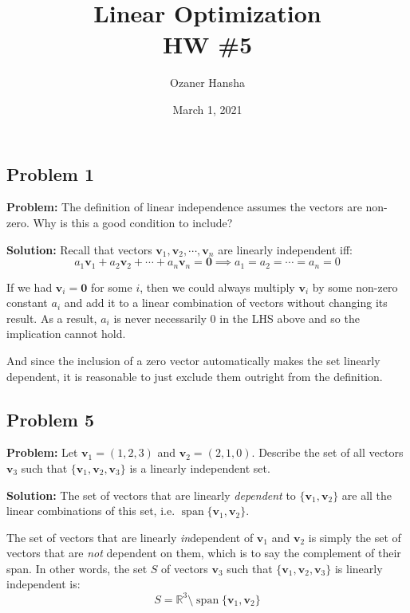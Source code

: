\documentclass{article}
\renewcommand\vec{\mathbf}
\newcommand{\R}{\mathbb R}
\begin{document}
\title{Linear Optimization\\HW \#5}
\author{Ozaner Hansha}
\date{March 1, 2021}
\maketitle

\subsection*{Problem 1}
\noindent\textbf{Problem:} The definition of linear independence assumes the vectors are non-zero. Why is this a good condition to include?
\bigskip

\noindent\textbf{Solution:} Recall that vectors $\vec v_1,\vec v_2,\cdots,\vec v_n$ are linearly independent iff:
\begin{equation*}
    a_1\vec v_1+a_2\vec v_2+\cdots+a_n\vec v_n=\vec 0\implies a_1=a_2=\cdots=a_n=0
\end{equation*}

If we had $\vec v_i=\vec 0$ for some $i$, then we could always multiply $\vec v_i$ by some non-zero constant $a_i$ and add it to a linear combination of vectors without changing its result. As a result, $a_i$ is never necessarily 0 in the LHS above and so the implication cannot hold.

And since the inclusion of a zero vector automatically makes the set linearly dependent, it is reasonable to just exclude them outright from the definition.

\subsection*{Problem 5}
\noindent\textbf{Problem:} Let $\vec v_1 = (1, 2, 3)$ and $\vec v_2 = (2, 1, 0)$. Describe the set of all vectors $\vec v_3$ such that $\{\vec v_1, \vec v_2, \vec v_3\}$ is a linearly independent set.
\bigskip

\noindent\textbf{Solution:} The set of vectors that are linearly \textit{dependent} to $\{\vec v_1,\vec v_2\}$ are all the linear combinations of this set, i.e. $\operatorname{span}\{\vec v_1,\vec v_2\}$.

The set of vectors that are linearly \textit{in}dependent of $\vec v_1$ and $\vec v_2$ is simply the set of vectors that are \textit{not} dependent on them, which is to say the complement of their span. In other words, the set $S$ of vectors $\vec v_3$ such that $\{\vec v_1,\vec v_2,\vec v_3\}$ is linearly independent is:
$$S=\R^3\setminus\operatorname{span}\{\vec v_1,\vec v_2\}$$
\end{document}
